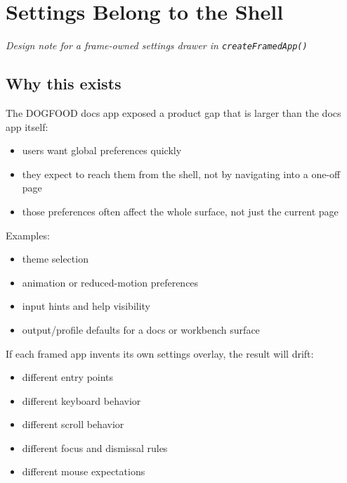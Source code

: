 \chapter{Settings Belong to the Shell}\label{record-057}

\smallskip

\emph{Design note for a frame-owned settings drawer in \texttt{c\allowbreak{}r\allowbreak{}e\allowbreak{}a\allowbreak{}t\allowbreak{}e\allowbreak{}F\allowbreak{}r\allowbreak{}a\allowbreak{}m\allowbreak{}e\allowbreak{}d\allowbreak{}A\allowbreak{}p\allowbreak{}p\allowbreak{}(\allowbreak{})}}

\section{Why this exists}\label{record-057-why-this-exists}

The DOGFOOD docs app exposed a product gap that is larger than the docs app itself:

\begin{itemize}
\tightlist
\item
  users want global preferences quickly
\item
  they expect to reach them from the shell, not by navigating into a one-off page
\item
  those preferences often affect the whole surface, not just the current page
\end{itemize}

Examples:

\begin{itemize}
\tightlist
\item
  theme selection
\item
  animation or reduced-motion preferences
\item
  input hints and help visibility
\item
  output/profile defaults for a docs or workbench surface
\end{itemize}

If each framed app invents its own settings overlay, the result will drift:

\begin{itemize}
\tightlist
\item
  different entry points
\item
  different keyboard behavior
\item
  different scroll behavior
\item
  different focus and dismissal rules
\item
  different mouse expectations
\end{itemize}

